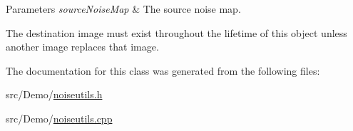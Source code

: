 \begin{DoxyParams}{Parameters}
{\em source\+Noise\+Map} & The source noise map.\\
\hline
\end{DoxyParams}
The destination image must exist throughout the lifetime of this object unless another image replaces that image. 

The documentation for this class was generated from the following files\+:\begin{DoxyCompactItemize}
\item 
src/\+Demo/\hyperlink{_demo_2noiseutils_8h}{noiseutils.\+h}\item 
src/\+Demo/\hyperlink{_demo_2noiseutils_8cpp}{noiseutils.\+cpp}\end{DoxyCompactItemize}
